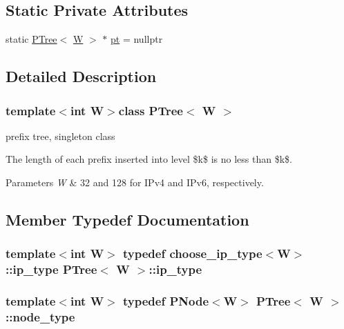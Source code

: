 \subsection*{Static Private Attributes}
\begin{DoxyCompactItemize}
\item 
static \hyperlink{classPTree}{P\-Tree}$<$ \hyperlink{test__u128_8cpp_ab21b528bc38899d04d3a7053e52fb797}{W} $>$ $\ast$ \hyperlink{classPTree_a78fb787b80f61d94c4ce92d1fd6f38b4}{pt} = nullptr
\end{DoxyCompactItemize}


\subsection{Detailed Description}
\subsubsection*{template$<$int W$>$class P\-Tree$<$ W $>$}

prefix tree, singleton class 

The length of each prefix inserted into level \$k\$ is no less than \$k\$.


\begin{DoxyParams}{Parameters}
{\em W} & 32 and 128 for I\-Pv4 and I\-Pv6, respectively. \\
\hline
\end{DoxyParams}


\subsection{Member Typedef Documentation}
\hypertarget{classPTree_a946047316df947ae9fbb8a9372c51e77}{
\subsubsection[{ip\-\_\-type}]{\setlength{\rightskip}{0pt plus 5cm}template$<$int W$>$ typedef {\bf choose\-\_\-ip\-\_\-type}$<${\bf W}$>$\-::{\bf ip\-\_\-type} {\bf P\-Tree}$<$ {\bf W} $>$\-::{\bf ip\-\_\-type}\hspace{0.3cm}{\ttfamily [private]}}}\label{classPTree_a946047316df947ae9fbb8a9372c51e77}
\hypertarget{classPTree_ad1004ef68aec722b83a6055ad8e9db55}{
\subsubsection[{node\-\_\-type}]{\setlength{\rightskip}{0pt plus 5cm}template$<$int W$>$ typedef {\bf P\-Node}$<${\bf W}$>$ {\bf P\-Tree}$<$ {\bf W} $>$\-::{\bf node\-\_\-type}\hspace{0.3cm}{\ttfamily [private]}}}\label{classPTree_ad1004ef68aec722b83a6055ad8e9db55}


